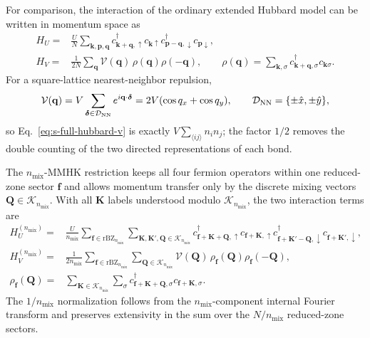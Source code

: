 \documentclass[10pt]{article}
\newcommand{\nmix}{n_{\mathrm{mix}}}
\begin{document}
For comparison, the interaction of the ordinary extended Hubbard model can be written in momentum space as
\begin{align}
 H_U={}&\frac{U}{N}\sum_{\mathbf k,\mathbf p,\mathbf q}
 c^\dagger_{\mathbf k+\mathbf q,\uparrow}c_{\mathbf k\uparrow}
 c^\dagger_{\mathbf p-\mathbf q,\downarrow}c_{\mathbf p\downarrow},
 \label{eq:s-full-hubbard-u}\\
 H_V={}&\frac{1}{2N}\sum_{\mathbf q}
 \mathcal V(\mathbf q)\,\rho(\mathbf q)\rho(-\mathbf q),
 \qquad
 \rho(\mathbf q)=\sum_{\mathbf k,\sigma}
 c^\dagger_{\mathbf k+\mathbf q,\sigma}c_{\mathbf k\sigma}.
 \label{eq:s-full-hubbard-v}
\end{align}
For a square-lattice nearest-neighbor repulsion,
\begin{equation}
 \mathcal V(\mathbf q)
 =V\sum_{\boldsymbol\delta\in\mathcal D_{\rm NN}}
 e^{i\mathbf q\cdot\boldsymbol\delta}
 =2V(\cos q_x+\cos q_y),
 \qquad
 \mathcal D_{\rm NN}=\{\pm\hat x,\pm\hat y\},
 \label{eq:s-v-form-factor}
\end{equation}
so Eq.~\ref{eq:s-full-hubbard-v} is exactly $V\sum_{\langle ij\rangle}n_i n_j$; the factor $1/2$ removes the double counting of the two directed representations of each bond.

The $\nmix$-MMHK restriction keeps all four fermion operators within one reduced-zone sector $\mathbf f$ and allows momentum transfer only by the discrete mixing vectors $\mathbf Q\in\mathcal K_{\nmix}$. With all $\mathbf K$ labels understood modulo $\mathcal K_{\nmix}$, the two interaction terms are
\begin{align}
 H_U^{(\nmix)}={}&\frac{U}{\nmix}\sum_{\mathbf f\in\mathrm{rBZ}_{\nmix}}
 \sum_{\mathbf K,\mathbf K',\mathbf Q\in\mathcal K_{\nmix}}
 c^\dagger_{\mathbf f+\mathbf K+\mathbf Q,\uparrow}
 c_{\mathbf f+\mathbf K,\uparrow}
 c^\dagger_{\mathbf f+\mathbf K'-\mathbf Q,\downarrow}
 c_{\mathbf f+\mathbf K',\downarrow},
 \label{eq:s-mmhk-u-momentum}\\
 H_V^{(\nmix)}={}&\frac{1}{2\nmix}\sum_{\mathbf f\in\mathrm{rBZ}_{\nmix}}
 \sum_{\mathbf Q\in\mathcal K_{\nmix}}
 \mathcal V(\mathbf Q)\,
 \rho_{\mathbf f}(\mathbf Q)\rho_{\mathbf f}(-\mathbf Q),
 \label{eq:s-mmhk-v-momentum}\\[-0.25em]
 \rho_{\mathbf f}(\mathbf Q)={}&
 \sum_{\mathbf K\in\mathcal K_{\nmix}}\sum_\sigma
 c^\dagger_{\mathbf f+\mathbf K+\mathbf Q,\sigma}
 c_{\mathbf f+\mathbf K,\sigma}.
 \nonumber
\end{align}
The $1/\nmix$ normalization follows from the $\nmix$-component internal Fourier transform and preserves extensivity in the sum over the $N/\nmix$ reduced-zone sectors.
\end{document}
